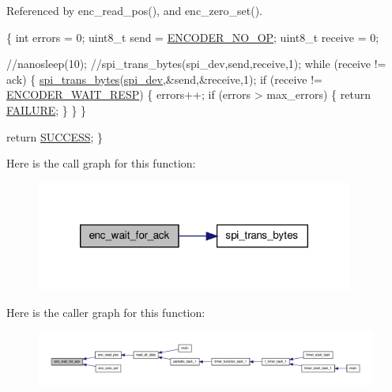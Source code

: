 Referenced by enc\-\_\-read\-\_\-pos(), and enc\-\_\-zero\-\_\-set().


\begin{DoxyCode}
\{
    \textcolor{keywordtype}{int} errors = 0;
    uint8\_t send = \hyperlink{encoder__functions_8h_ac10b0f18ed2164776ad6843aa7908592}{ENCODER\_NO\_OP};
    uint8\_t receive = 0;
        
  \textcolor{comment}{//nanosleep(10);}
        \textcolor{comment}{//spi\_trans\_bytes(spi\_dev,send,receive,1);}
    \textcolor{keywordflow}{while} (receive != ack) \{
        \hyperlink{communication_2spi__functions_8c_a3ae450d2b3ece27bb6036f811a7625a9}{spi\_trans\_bytes}(\hyperlink{CommunicationV0_2communication_8c_a4788f0a5355494bc6c13690e28f43783}{spi\_dev},&send,&receive,1);
        \textcolor{keywordflow}{if} (receive != \hyperlink{encoder__functions_8h_a77c3a97f7312d858d04ec3b4e1fb2176}{ENCODER\_WAIT\_RESP}) \{
            errors++;
            \textcolor{keywordflow}{if} (errors > max\_errors) \{ \textcolor{keywordflow}{return} \hyperlink{calibration_2calibration_8h_a6d58f9ac447476b4e084d7ca383f5183}{FAILURE}; \}
        \}
    \}

    \textcolor{keywordflow}{return} \hyperlink{calibration_2calibration_8h_aa90cac659d18e8ef6294c7ae337f6b58}{SUCCESS};
\}
\end{DoxyCode}


Here is the call graph for this function\-:
\nopagebreak
\begin{figure}[H]
\begin{center}
\leavevmode
\includegraphics[width=296pt]{group__enc_gad82fb44f2e735628ec95e003e4a1f93c_cgraph}
\end{center}
\end{figure}




Here is the caller graph for this function\-:
\nopagebreak
\begin{figure}[H]
\begin{center}
\leavevmode
\includegraphics[width=350pt]{group__enc_gad82fb44f2e735628ec95e003e4a1f93c_icgraph}
\end{center}
\end{figure}


